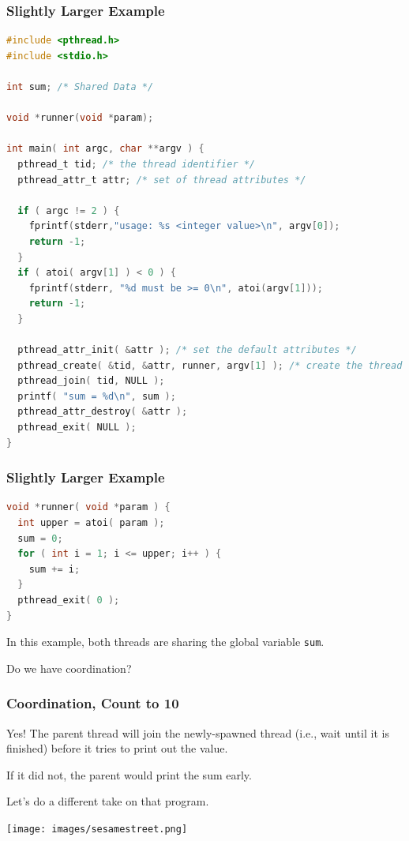 \begin{frame}[fragile]
	\frametitle{Slightly Larger Example}

	\begin{lstlisting}[language=C]
#include <pthread.h>
#include <stdio.h>

int sum; /* Shared Data */

void *runner(void *param);

int main( int argc, char **argv ) {
  pthread_t tid; /* the thread identifier */
  pthread_attr_t attr; /* set of thread attributes */

  if ( argc != 2 ) {
    fprintf(stderr,"usage: %s <integer value>\n", argv[0]);
    return -1;
  }
  if ( atoi( argv[1] ) < 0 ) {
    fprintf(stderr, "%d must be >= 0\n", atoi(argv[1]));
    return -1;
  }

  pthread_attr_init( &attr ); /* set the default attributes */
  pthread_create( &tid, &attr, runner, argv[1] ); /* create the thread */
  pthread_join( tid, NULL );
  printf( "sum = %d\n", sum );
  pthread_attr_destroy( &attr );
  pthread_exit( NULL );
}
\end{lstlisting}


\end{frame}

\begin{frame}[fragile]
	\frametitle{Slightly Larger Example}


	\begin{lstlisting}[language=C]
void *runner( void *param ) {
  int upper = atoi( param );
  sum = 0;
  for ( int i = 1; i <= upper; i++ ) {
    sum += i;
  }
  pthread_exit( 0 );
}
\end{lstlisting}

	In this example, both threads are sharing the global variable \texttt{sum}.

	Do we have coordination?

\end{frame}


\begin{frame}
	\frametitle{Coordination, Count to 10}
	Yes! The parent thread will join the newly-spawned thread (i.e., wait until it is finished) before it tries to print out the value.

	If it did not, the parent would print the sum early.

	Let's do a different take on that program.

	\begin{center}
		\texttt{[image: images/sesamestreet.png]}
	\end{center}

\end{frame}

